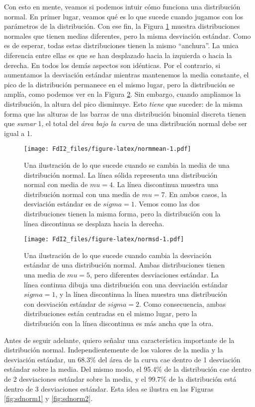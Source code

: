 \documentclass[spanish,]{book}
\begin{document}
Con esto en mente, veamos si podemos intuir cómo funciona una
distribución normal. En primer lugar, veamos qué es lo que sucede cuando
jugamos con los parámetros de la distribución. Con ese fin, la Figura
\ref{fig:normmean} muestra distribuciones normales que tienen medias
diferentes, pero la misma desviación estándar. Como es de esperar, todas
estas distribuciones tienen la mismo ``anchura''. La unica diferencia
entre ellas es que se han desplazado hacia la izquierda o hacia la
derecha. En todos los demás aspectos son idénticas. Por el contrario, si
aumentamos la desviación estándar mientras mantenemos la media
constante, el pico de la distribución permanece en el mismo lugar, pero
la distribución se amplía, como podemos ver en la Figura
\ref{fig:normsd}. Sin embargo, cuando ampliamos la distribución, la
altura del pico disminuye. Esto \emph{tiene} que suceder: de la misma
forma que las alturas de las barras de una distribución binomial
discreta tienen que \emph{sumar} 1, el total del \emph{área bajo la
curva} de una distribución normal debe ser igual a 1.

\begin{figure}
\centering
\texttt{[image: FdI2\_files/figure-latex/normmean-1.pdf]}
\caption{\label{fig:normmean}Una ilustración de lo que sucede cuando se
cambia la media de una distribución normal. La línea sólida representa
una distribución normal con media de \(mu=4\). La línea discontinua
muestra una distribución normal con una media de \(mu=7\). En ambos
casos, la desviación estándar es de \(sigma=1\). Vemos como las dos
distribuciones tienen la misma forma, pero la distribución con la línea
discontinua se desplaza hacia la derecha.}
\end{figure}

\begin{figure}
\centering
\texttt{[image: FdI2\_files/figure-latex/normsd-1.pdf]}
\caption{\label{fig:normsd}Una ilustración de lo que sucede cuando cambia la
desviación estándar de una distribución normal. Ambas distribuciones
tienen una media de \(mu=5\), pero diferentes desviaciones estándar. La
línea continua dibuja una distribución con una desviación estándar
\(sigma=1\), y la línea discontinua la línea muestra una distribución
con desviación estándar de \(sigma=2\). Como consecuencia, ambas
distribuciones están centradas en el mismo lugar, pero la distribución
con la línea discontinua es más ancha que la otra.}
\end{figure}

Antes de seguir adelante, quiero señalar una característica importante
de la distribución normal. Independientemente de los valores de la media
y la desviación estándar, un 68.3\% del área de la curva cae dentro de 1
desviación estándar sobre la media. Del mismo modo, el 95.4\% de la
distribución cae dentro de 2 desviaciones estándar sobre la media, y el
99.7\% de la distribución está dentro de 3 desviaciones estándar. Esta
idea se ilustra en las Figuras \ref{fig:sdnorm1} y \ref{fig:sdnorm2}.
\end{document}
